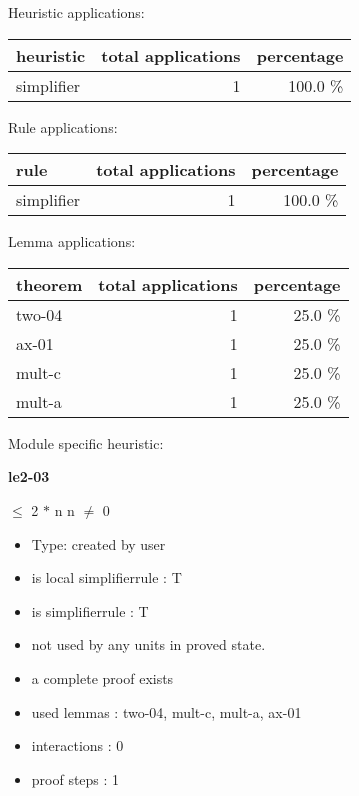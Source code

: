 \documentclass[a4paper]{article}
\begin{document}
\medskip


Heuristic applications:

\begin{supertabular}{l|r|r}
heuristic	& total applications & percentage \\ \hline
simplifier & 1 & 100.0 \% \\

\end{supertabular}

Rule applications:

\begin{supertabular}{l|r|r}
rule	        & total applications & percentage \\ \hline
simplifier & 1 & 100.0 \% \\

\end{supertabular}

Lemma applications:

\begin{supertabular}{l|r|r}
theorem	        & total applications & percentage \\ \hline
two-04 & 1 & 25.0 \% \\
ax-01 & 1 & 25.0 \% \\
mult-c & 1 & 25.0 \% \\
mult-a & 1 & 25.0 \% \\

\end{supertabular}

Module specific heuristic:

\pagebreak

{\LARGE\bf le2-03}\label{lemma-le2-03}

\medskip

  $\le$ 2 $*$ n \Equiv n $\neq$ 0

\begin{itemize}

\item Type: created by user

\item is local simplifierrule : T
\item is simplifierrule : T
\item not used by any units in proved state.
\item       a complete proof exists
\item       used lemmas  : two-04, mult-c, mult-a, ax-01
\item       interactions : 0
\item       proof steps  : 1
\end{itemize}
\end{document}
